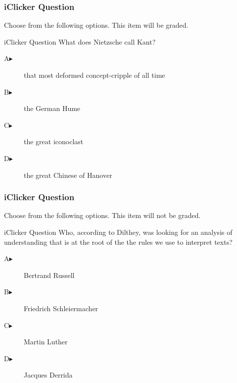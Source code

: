 \documentclass[xcolor=dvipsnames]{beamer}
\begin{document}
\begin{frame}
  \frametitle{iClicker Question}
Choose from the following options. This item will be graded.
\begin{block}{iClicker Question}
What does Nietzsche call Kant?
\end{block}
\begin{description}
\item[A\hspace{.2in}$\blacktriangleright$] that most deformed concept-cripple of all time
\item[B\hspace{.2in}$\blacktriangleright$] the German Hume
\item[C\hspace{.2in}$\blacktriangleright$] the great iconoclast
\item[D\hspace{.2in}$\blacktriangleright$] the great Chinese of Hanover
\end{description}
\end{frame}

\begin{frame}
  \frametitle{iClicker Question}
Choose from the following options. This item will not be graded.
\begin{block}{iClicker Question}
Who, according to Dilthey, was looking for an analysis of
understanding that is at the root of the the rules we use to interpret texts?
\end{block}
\begin{description}
\item[A\hspace{.2in}$\blacktriangleright$] Bertrand Russell
\item[B\hspace{.2in}$\blacktriangleright$] Friedrich Schleiermacher
\item[C\hspace{.2in}$\blacktriangleright$] Martin Luther
\item[D\hspace{.2in}$\blacktriangleright$] Jacques Derrida
\end{description}
\end{frame}
\end{document}
